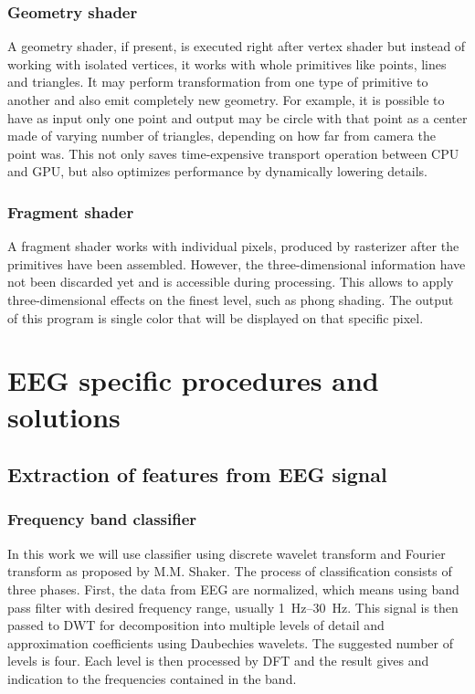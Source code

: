 \subsection{Geometry shader}
A geometry shader, if present, is executed right after vertex shader but instead
of working with isolated vertices, it works with whole primitives like points,
lines and triangles. It may perform transformation from one type of primitive to
another and also emit completely new geometry. For example, it is possible to
have as input only one point and output may be circle with that point as a
center made of varying number of triangles, depending on how far from camera
the point was. This not only saves time-expensive transport operation between
CPU and GPU, but also optimizes performance by dynamically lowering details.

\subsection{Fragment shader}
A fragment shader works with individual pixels, produced by rasterizer after the
primitives have been assembled. However, the three-dimensional information have
not been discarded yet and is accessible during processing. This allows to apply
three-dimensional effects on the finest level, such as phong shading. The output
of this program is single color that will be displayed on that specific pixel.

\chapter{EEG specific procedures and solutions} \label{eegProcAndSol}
\section{Extraction of features from EEG signal} \label{signalExtraction}
\subsection{Frequency band classifier} \label{eegClassifier}
In this work we will use classifier using discrete wavelet transform and Fourier
transform as proposed by M.M. Shaker. \cite{eegWaveFt} The process of
classification consists of three phases. First, the data from EEG are
normalized, which means using band pass filter with desired frequency range,
usually \SIrange{1}{30}{\Hz}. This signal is then passed to DWT for
decomposition into multiple levels of detail and approximation coefficients
using Daubechies wavelets. The suggested number of levels is four. Each level is
then processed by DFT and the result gives and indication to the frequencies
contained in the band.

